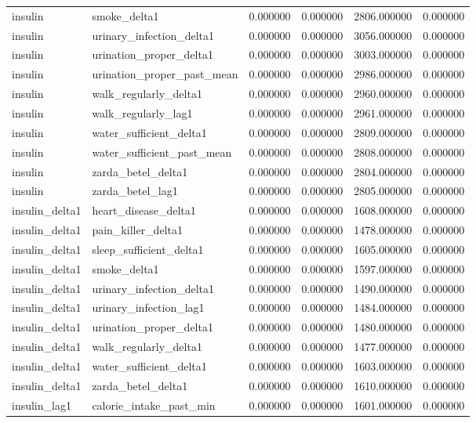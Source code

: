 \begin{longtable}{llrrrr}
insulin & smoke\_delta1 & 0.000000 & 0.000000 & 2806.000000 & 0.000000 \\
insulin & urinary\_infection\_delta1 & 0.000000 & 0.000000 & 3056.000000 & 0.000000 \\
insulin & urination\_proper\_delta1 & 0.000000 & 0.000000 & 3003.000000 & 0.000000 \\
insulin & urination\_proper\_past\_mean & 0.000000 & 0.000000 & 2986.000000 & 0.000000 \\
insulin & walk\_regularly\_delta1 & 0.000000 & 0.000000 & 2960.000000 & 0.000000 \\
insulin & walk\_regularly\_lag1 & 0.000000 & 0.000000 & 2961.000000 & 0.000000 \\
insulin & water\_sufficient\_delta1 & 0.000000 & 0.000000 & 2809.000000 & 0.000000 \\
insulin & water\_sufficient\_past\_mean & 0.000000 & 0.000000 & 2808.000000 & 0.000000 \\
insulin & zarda\_betel\_delta1 & 0.000000 & 0.000000 & 2804.000000 & 0.000000 \\
insulin & zarda\_betel\_lag1 & 0.000000 & 0.000000 & 2805.000000 & 0.000000 \\
insulin\_delta1 & heart\_disease\_delta1 & 0.000000 & 0.000000 & 1608.000000 & 0.000000 \\
insulin\_delta1 & pain\_killer\_delta1 & 0.000000 & 0.000000 & 1478.000000 & 0.000000 \\
insulin\_delta1 & sleep\_sufficient\_delta1 & 0.000000 & 0.000000 & 1605.000000 & 0.000000 \\
insulin\_delta1 & smoke\_delta1 & 0.000000 & 0.000000 & 1597.000000 & 0.000000 \\
insulin\_delta1 & urinary\_infection\_delta1 & 0.000000 & 0.000000 & 1490.000000 & 0.000000 \\
insulin\_delta1 & urinary\_infection\_lag1 & 0.000000 & 0.000000 & 1484.000000 & 0.000000 \\
insulin\_delta1 & urination\_proper\_delta1 & 0.000000 & 0.000000 & 1480.000000 & 0.000000 \\
insulin\_delta1 & walk\_regularly\_delta1 & 0.000000 & 0.000000 & 1477.000000 & 0.000000 \\
insulin\_delta1 & water\_sufficient\_delta1 & 0.000000 & 0.000000 & 1603.000000 & 0.000000 \\
insulin\_delta1 & zarda\_betel\_delta1 & 0.000000 & 0.000000 & 1610.000000 & 0.000000 \\
insulin\_lag1 & calorie\_intake\_past\_min & 0.000000 & 0.000000 & 1601.000000 & 0.000000 \\

\end{longtable}
